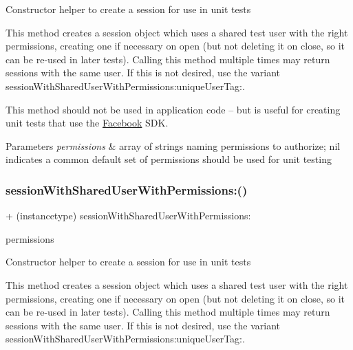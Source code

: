 Constructor helper to create a session for use in unit tests

This method creates a session object which uses a shared test user with the right permissions, creating one if necessary on open (but not deleting it on close, so it can be re-\/used in later tests). Calling this method multiple times may return sessions with the same user. If this is not desired, use the variant session\+With\+Shared\+User\+With\+Permissions\+:unique\+User\+Tag\+:.

This method should not be used in application code -- but is useful for creating unit tests that use the \hyperlink{interfaceFacebook}{Facebook} S\+DK.


\begin{DoxyParams}{Parameters}
{\em permissions} & array of strings naming permissions to authorize; nil indicates a common default set of permissions should be used for unit testing \\
\hline
\end{DoxyParams}
\mbox{\label{interfaceFBTestSession_a27f8f36ddb23ea218117bc2e927d8039}} 
\subsubsection{\texorpdfstring{session\+With\+Shared\+User\+With\+Permissions\+:()}{sessionWithSharedUserWithPermissions:()}\hspace{0.1cm}{\footnotesize\ttfamily [5/5]}}
{\footnotesize\ttfamily + (instancetype) session\+With\+Shared\+User\+With\+Permissions\+: \begin{DoxyParamCaption}\item[{(N\+S\+Array $\ast$)}]{permissions }\end{DoxyParamCaption}}

Constructor helper to create a session for use in unit tests

This method creates a session object which uses a shared test user with the right permissions, creating one if necessary on open (but not deleting it on close, so it can be re-\/used in later tests). Calling this method multiple times may return sessions with the same user. If this is not desired, use the variant session\+With\+Shared\+User\+With\+Permissions\+:unique\+User\+Tag\+:.

